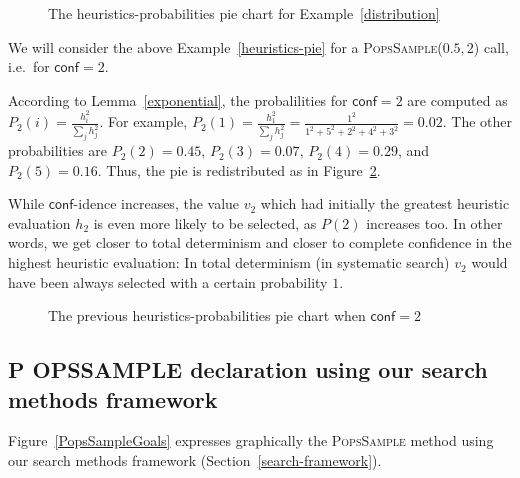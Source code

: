 \documentclass{ws-ijait}
\begin{document}
\begin{figure}
  \centering
  
  \caption{The heuristics-probabilities pie chart for
           Example~\ref{distribution}\label{piechart}}
\end{figure}

\begin{example}
  \label{heuristics-pie2}
  We will consider the above Example~\ref{heuristics-pie}
  for a \textsc{PopsSample}($0.5, 2$) call, i.e.\ for
  $\mathsf{conf} = 2$.

  According to Lemma~\ref{exponential}, the probalilities
  for $\mathsf{conf} = 2$ are computed as $P_2(i) =
  \frac{h_i^2}{\sum_j h_j^2}$. For example, $P_2(1) =
  \frac{h_1^2}{\sum_j h_j^2} = \frac{1^2}{1^2 + 5^2 + 2^2 +
  4^2 + 3^2} = 0.02$. The other probabilities are $P_2(2) =
  0.45$, $P_2(3) = 0.07$, $P_2(4) = 0.29$, and $P_2(5) =
  0.16$. Thus, the pie is redistributed as in
  Figure~\ref{piechart2}.

  While $\mathsf{conf}$-idence increases, the value $v_2$
  which had initially the greatest heuristic evaluation
  $h_2$ is even more likely to be selected, as $P(2)$
  increases too. In other words, we get closer to total
  determinism and closer to complete confidence in the
  highest heuristic evaluation: In total determinism (in
  systematic search) $v_2$ would have been always selected
  with a certain probability $1$.
\end{example}

\begin{figure}
  \centering
  
  \caption{The previous heuristics-probabilities pie chart
           when $\mathsf{conf} = 2$\label{piechart2}}
\end{figure}

\newcommand{\PoPS}{\textbf{\normalsize P\footnotesize
                           O\normalsize PS}}
\newcommand{\PopsSample}{\textbf{\normalsize P\footnotesize
                       OPS\normalsize S\footnotesize AMPLE}}

\subsection{\PopsSample{} declaration using our search
            methods framework}

Figure~\ref{PopsSampleGoals} expresses graphically the
\textsc{PopsSample} method using our search methods
framework (Section~\ref{search-framework}).
\end{document}
